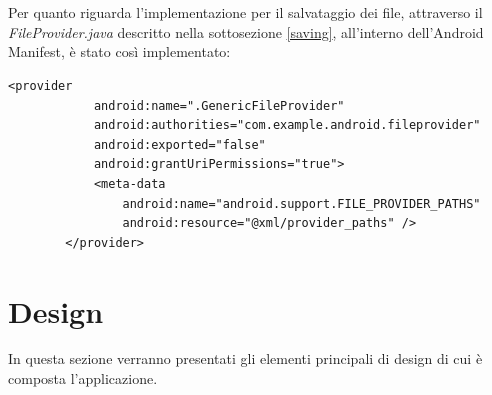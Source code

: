 \\\\Per quanto riguarda l'implementazione per il salvataggio dei file, attraverso il \textit{FileProvider.java} descritto nella sottosezione \ref{saving}, all'interno dell'Android Manifest, è stato così implementato:
\begin{lstlisting}
<provider
            android:name=".GenericFileProvider"
            android:authorities="com.example.android.fileprovider"
            android:exported="false"
            android:grantUriPermissions="true">
            <meta-data
                android:name="android.support.FILE_PROVIDER_PATHS"
                android:resource="@xml/provider_paths" />
        </provider>
\end{lstlisting}

\section{Design}
\label{design}
In questa sezione verranno presentati gli elementi principali di design di cui è composta l'applicazione.
